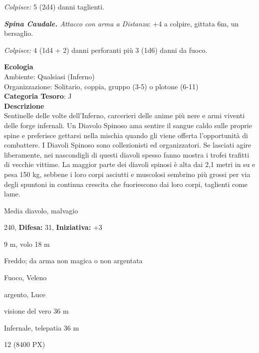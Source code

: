\begin{multicols}{2}
{\emph{Colpisce:} 5 (2d4) danni taglienti.

\emph{\textbf{Spina Caudale.} Attacco con arma a Distanza}: +4 a colpire, gittata 6m, un bersaglio.

\emph{Colpisce:} 4 (1d4 + 2) danni perforanti più 3 (1d6) danni da fuoco.

\textbf{Ecologia}\\
Ambiente: Qualsiasi (Inferno)\\
Organizzazione: Solitario, coppia, gruppo (3-5) o plotone (6-11)\\
\textbf{Categoria Tesoro}: J\\
\textbf{Descrizione}\\
Sentinelle delle volte dell'Inferno, carcerieri delle anime più nere e armi viventi delle forge infernali. Un Diavolo Spinoso ama sentire il sangue caldo sulle proprie spine e preferisce gettarsi nella mischia quando gli viene offerta l'opportunità di combattere.
I Diavoli Spinoso sono collezionisti ed organizzatori. Se lasciati agire liberamente, nei nascondigli di questi diavoli spesso fanno mostra i trofei trafitti di vecchie vittime.
La maggior parte dei diavoli spinosi è alta dai 2,1 metri in su e pesa 150 kg, sebbene i loro corpi asciutti e muscolosi sembrino più grossi per via degli spuntoni in continua crescita che fuoriescono dai loro corpi, taglienti come lame.

\noindent
\begin{description}[noitemsep, topsep=0pt, parsep=0pt, partopsep=0pt, leftmargin=0cm, labelwidth=2.2cm]
	\item[\textbf{Taglia/Tipo:}] Media diavolo, malvagio
	\item[\textbf{Caratt.:}] 
	\item[\textbf{Punti Ferita:}] 240,  \textbf{Difesa:} 31,  \textbf{Iniziativa:} +3
	\item[\textbf{Movimento:}] 9 m, volo 18 m
	\item[\textbf{Tiri Salvez.:}] 
	\item[\textbf{Res. Danni:}] Freddo; da arma non magica o non argentata
	\item[\textbf{Imm. Danni:}] Fuoco, Veleno
	\item[\textbf{Vulnerabilità:}] argento, Luce
	\item[\textbf{Sensi:}] visione del vero 36 m
	\item[\textbf{Linguaggi:}] Infernale, telepatia 36 m
	\item[\textbf{Sfida:}] 12 (8400 PX)\smallskip
\end{description}

}
\end{multicols}
